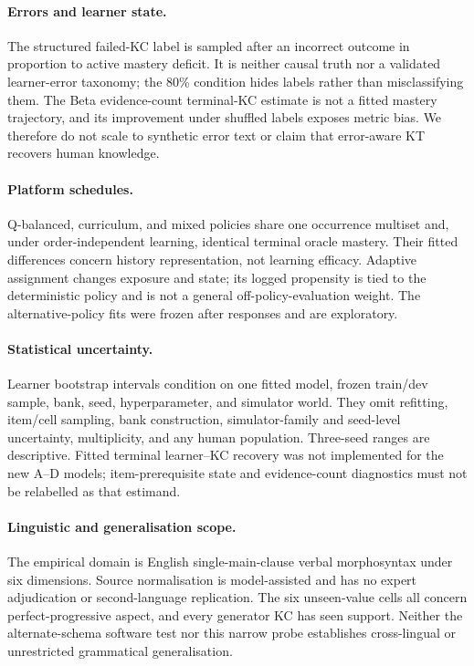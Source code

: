 \paragraph{Errors and learner state.}
The structured failed-KC label is sampled after an incorrect outcome in
proportion to active mastery deficit.  It is neither causal truth nor a
validated learner-error taxonomy; the 80\% condition hides labels rather than
misclassifying them.  The Beta evidence-count terminal-KC estimate is not a
fitted mastery trajectory, and its improvement under shuffled labels exposes
metric bias.  We therefore do not scale to synthetic error text or claim that
error-aware KT recovers human knowledge.

\paragraph{Platform schedules.}
Q-balanced, curriculum, and mixed policies share one occurrence multiset and,
under order-independent learning, identical terminal oracle mastery.  Their
fitted differences concern history representation, not learning efficacy.
Adaptive assignment changes exposure and state; its logged propensity is tied
to the deterministic policy and is not a general off-policy-evaluation weight.
The alternative-policy fits were frozen after responses and are exploratory.

\paragraph{Statistical uncertainty.}
Learner bootstrap intervals condition on one fitted model, frozen train/dev
sample, bank, seed, hyperparameter, and simulator world.  They omit refitting,
item/cell sampling, bank construction, simulator-family and seed-level
uncertainty, multiplicity, and any human population.  Three-seed ranges are
descriptive.  Fitted terminal learner--KC recovery was not implemented for the
new A--D models; item-prerequisite state and evidence-count diagnostics must not
be relabelled as that estimand.

\paragraph{Linguistic and generalisation scope.}
The empirical domain is English single-main-clause verbal morphosyntax under
six dimensions.  Source normalisation is model-assisted and has no expert
adjudication or second-language replication.  The six unseen-value cells all
concern perfect-progressive aspect, and every generator KC has seen support.
Neither the alternate-schema software test nor this narrow probe establishes
cross-lingual or unrestricted grammatical generalisation.

